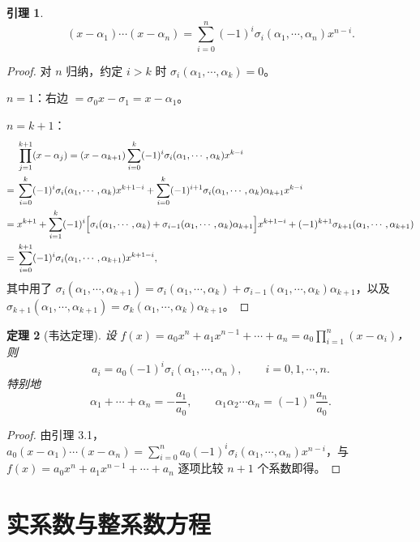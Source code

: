 \documentclass[UTF8,11pt]{ctexart}
\theoremstyle{cnthm}
\newtheorem{thm}{定理}[section]
\newtheorem{lem}[thm]{引理}
\begin{document}
\begin{lem}
\[
(x-\alpha_1)\cdots(x-\alpha_n)=\sum_{i=0}^{n}(-1)^i\sigma_i(\alpha_1,\cdots,\alpha_n)x^{n-i}.
\]
\end{lem}

\begin{proof}
对 $n$ 归纳，约定 $i>k$ 时 $\sigma_i(\alpha_1,\cdots,\alpha_k)=0$。

$n=1$：右边 $=\sigma_0x-\sigma_1=x-\alpha_1$。

$n=k+1$：
\[
\begin{aligned}
&\prod_{j=1}^{k+1}(x-\alpha_j)
=(x-\alpha_{k+1})\sum_{i=0}^{k}(-1)^i\sigma_i(\alpha_1,\cdots,\alpha_k)x^{k-i}\\
={}&\sum_{i=0}^{k}(-1)^i\sigma_i(\alpha_1,\cdots,\alpha_k)x^{k+1-i}
+\sum_{i=0}^{k}(-1)^{i+1}\sigma_i(\alpha_1,\cdots,\alpha_k)\alpha_{k+1}x^{k-i}\\
={}&x^{k+1}+\sum_{i=1}^{k}(-1)^i\Bigl[\sigma_i(\alpha_1,\cdots,\alpha_k)
+\sigma_{i-1}(\alpha_1,\cdots,\alpha_k)\alpha_{k+1}\Bigr]x^{k+1-i}
+(-1)^{k+1}\sigma_{k+1}(\alpha_1,\cdots,\alpha_{k+1})\\
={}&\sum_{i=0}^{k+1}(-1)^i\sigma_i(\alpha_1,\cdots,\alpha_{k+1})x^{k+1-i},
\end{aligned}
\]
其中用了 $\sigma_i(\alpha_1,\cdots,\alpha_{k+1})=\sigma_i(\alpha_1,\cdots,\alpha_k)+\sigma_{i-1}(\alpha_1,\cdots,\alpha_k)\alpha_{k+1}$，以及 $\sigma_{k+1}(\alpha_1,\cdots,\alpha_{k+1})=\sigma_k(\alpha_1,\cdots,\alpha_k)\alpha_{k+1}$。
\end{proof}

\begin{thm}[韦达定理]
设 $f(x)=a_0x^n+a_1x^{n-1}+\cdots+a_n=a_0\prod\limits_{i=1}^{n}(x-\alpha_i)$，则
\[
a_i=a_0(-1)^i\sigma_i(\alpha_1,\cdots,\alpha_n),\qquad i=0,1,\cdots,n.
\]
特别地
\[
\alpha_1+\cdots+\alpha_n=-\frac{a_1}{a_0},\qquad
\alpha_1\alpha_2\cdots\alpha_n=(-1)^n\frac{a_n}{a_0}.
\]
\end{thm}

\begin{proof}
由引理 3.1，$a_0(x-\alpha_1)\cdots(x-\alpha_n)=\displaystyle\sum\limits_{i=0}^{n}a_0(-1)^i\sigma_i(\alpha_1,\cdots,\alpha_n)x^{n-i}$，与 $f(x)=a_0x^n+a_1x^{n-1}+\cdots+a_n$ 逐项比较 $n+1$ 个系数即得。
\end{proof}

\section{实系数与整系数方程}
\end{document}
